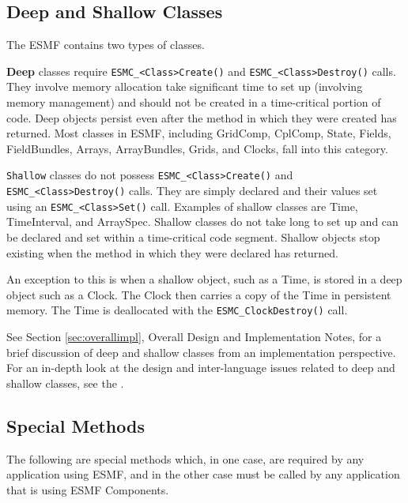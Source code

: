 \subsection{Deep and Shallow Classes}
\label{sec:deepshallow}

The ESMF contains two types of classes.

{\bf Deep} classes require
{\tt ESMC\_<Class>Create()} and {\tt ESMC\_<Class>Destroy()} calls.
They involve memory allocation take significant time to set up (involving
memory management) and should not be created in a time-critical portion of code.
Deep objects persist even after the method in which they were created has
returned. Most classes in ESMF, including GridComp, CplComp, State, Fields, FieldBundles, Arrays, ArrayBundles, Grids, and Clocks, fall into this category.

{\tt Shallow} classes do not possess {\tt ESMC\_<Class>Create()}
and {\tt ESMC\_<Class>Destroy()} calls.  They are simply declared
and their values set using an {\tt ESMC\_<Class>Set()} call.  
Examples of shallow classes are Time, TimeInterval, and ArraySpec.  Shallow classes do not take long to set up and can be declared and set within
a time-critical code segment.  Shallow objects stop existing when
the method in which they were declared has returned.  

An exception to this is when a shallow object, such as a Time, 
is stored in a deep object such as a Clock.  The Clock then
carries a copy of the Time in persistent memory.  The Time is
deallocated with the {\tt ESMC\_ClockDestroy()} call.

See Section \ref{sec:overallimpl}, Overall Design and Implementation 
Notes, for a brief discussion of deep and shallow classes from 
an implementation perspective.  For an in-depth look at the design 
and inter-language issues related to deep and shallow classes,
see the .

\subsection{Special Methods}

The following are special methods which, in one case,
are required by any application using ESMF, and in the 
other case must be called by any application that is using 
ESMF Components.

